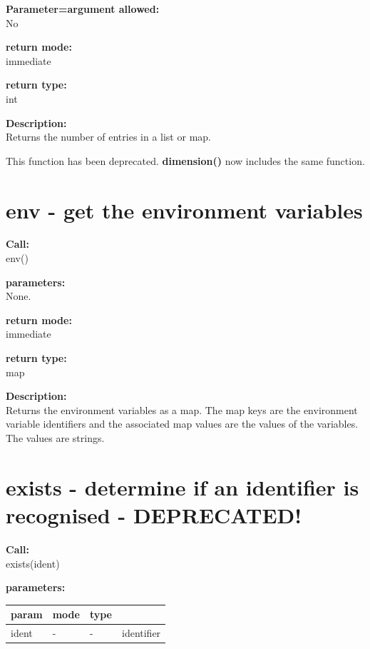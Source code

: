         {\bf Parameter=argument allowed:} \\
        No
        
        {\bf return mode:} \\
        immediate

        {\bf return type:} \\
        int
        
        {\bf Description:} \\
        Returns the number of entries in a list or map.
        
        This function has been deprecated. {\bf dimension()} now
        includes the same function.


    \section{env - get the environment variables}\label{sec:ifenv}
        
        {\bf Call:} \\
        env()
        
        {\bf parameters:} \\
        None.
        
        {\bf return mode:} \\
        immediate

        {\bf return type:} \\
        map
        
        {\bf Description:} \\
        Returns the environment variables as a map. The map keys are the
        environment variable identifiers and the associated map values
        are the values of the variables. The values are strings.


    \section{exists - determine if an identifier is recognised - DEPRECATED!}\label{sec:ifexists}
        
        {\bf Call:} \\
        exists(ident)
        
        {\bf parameters:} \\
        \begin{tabular}{| l | l | l | l |}
        \hline
        param  & mode & type & \\
        \hline \hline
        ident & - &  -  & identifier \\ \hline
        \end{tabular}
        
